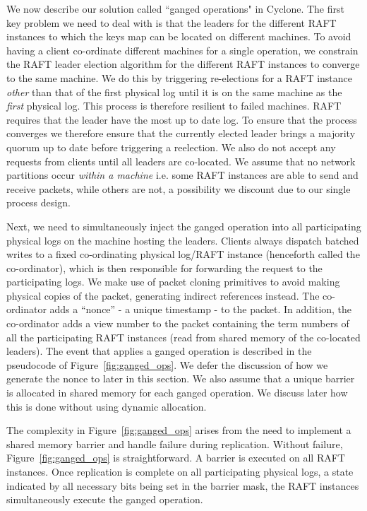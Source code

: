 \documentclass[letterpaper,twocolumn,10pt]{article}
\begin{document}
We now describe our solution called ``ganged operations" in Cyclone.
The first key problem we need to deal with is that the leaders for the
different RAFT instances to which the keys map can be located on
different machines. To avoid having a client co-ordinate different
machines for a single operation, we constrain the RAFT leader election
algorithm for the different RAFT instances to converge to the same
machine. We do this by triggering re-elections for a RAFT instance
\emph{other} than that of the first physical log until it is on the
same machine as the \emph{first} physical log. This process is
therefore resilient to failed machines. RAFT requires that the leader
have the most up to date log. To ensure that the process converges we
therefore ensure that the currently elected leader brings a majority
quorum up to date before triggering a reelection. We also do not
accept any requests from clients until all leaders are co-located. We
assume that no network partitions occur \emph{within a machine}
i.e. some RAFT instances are able to send and receive packets, while
others are not, a possibility we discount due to our single process
design.

Next, we need to simultaneously inject the ganged operation into all
participating physical logs on the machine hosting the
leaders. Clients always dispatch batched writes to a fixed
co-ordinating physical log/RAFT instance (henceforth called the
co-ordinator), which is then responsible for forwarding the request to
the participating logs. We make use of packet cloning primitives to
avoid making physical copies of the packet, generating indirect
references instead. The co-ordinator adds a ``nonce'' - a unique
timestamp - to the packet. In addition, the co-ordinator adds a view
number to the packet containing the term numbers of all the
participating RAFT instances (read from shared memory of the
co-located leaders).  The event that applies a ganged operation is
described in the pseudocode of Figure~\ref{fig:ganged_ops}. We defer
the discussion of how we generate the nonce to later in this
section. We also assume that a unique barrier is allocated in shared
memory for each ganged operation. We discuss later how this is done
without using dynamic allocation.

The complexity in Figure~\ref{fig:ganged_ops} arises from the need to
implement a shared memory barrier and handle failure during
replication. Without failure, Figure~\ref{fig:ganged_ops} is
straightforward. A barrier is executed on all RAFT instances. Once
replication is complete on all participating physical logs, a state
indicated by all necessary bits being set in the barrier mask, the
RAFT instances simultaneously execute the ganged operation.
\end{document}
